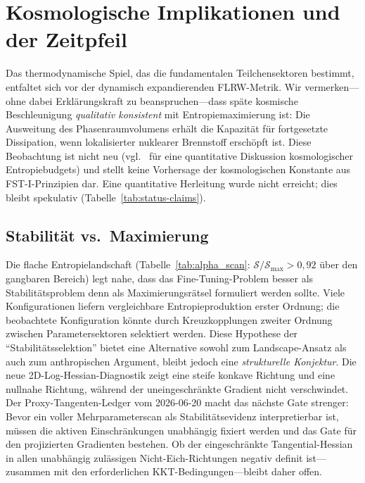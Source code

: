 \documentclass[12pt,a4paper]{article}
\theoremstyle{remark}
\begin{document}
\section{Kosmologische Implikationen und der Zeitpfeil}
\label{sec:cosmology}

Das thermodynamische Spiel, das die fundamentalen Teilchensektoren bestimmt, entfaltet sich vor der dynamisch expandierenden FLRW-Metrik. Wir vermerken---ohne dabei Erkl\"arungskraft zu beanspruchen---dass sp\"ate kosmische Beschleunigung \emph{qualitativ konsistent} mit Entropiemaximierung ist: Die Ausweitung des Phasenraumvolumens erh\"alt die Kapazit\"at f\"ur fortgesetzte Dissipation, wenn lokalisierter nuklearer Brennstoff ersch\"opft ist. Diese Beobachtung ist nicht neu (vgl.\ \citep{EntropyMaximum} f\"ur eine quantitative Diskussion kosmologischer Entropiebudgets) und stellt keine Vorhersage der kosmologischen Konstante aus FST-I-Prinzipien dar. Eine quantitative Herleitung wurde nicht erreicht; dies bleibt spekulativ (Tabelle~\ref{tab:status-claims}).

\subsection{Stabilit\"at vs.\ Maximierung}

Die flache Entropielandschaft (Tabelle~\ref{tab:alpha_scan}: $\mathcal{S}/\mathcal{S}_{\max} > 0{,}92$ \"uber den gangbaren Bereich) legt nahe, dass das Fine-Tuning-Problem besser als Stabilit\"atsproblem denn als Maximierungsr\"atsel formuliert werden sollte. Viele Konfigurationen liefern vergleichbare Entropieproduktion erster Ordnung; die beobachtete Konfiguration k\"onnte durch Kreuzkopplungen zweiter Ordnung zwischen Parametersektoren selektiert werden. Diese Hypothese der ``Stabilit\"atsselektion'' bietet eine Alternative sowohl zum Landscape-Ansatz als auch zum anthropischen Argument, bleibt jedoch eine \emph{strukturelle Konjektur}. Die neue 2D-Log-Hessian-Diagnostik zeigt eine steife konkave Richtung und eine nullnahe Richtung, w\"ahrend der uneingeschr\"ankte Gradient nicht verschwindet. Der Proxy-Tangenten-Ledger vom 2026-06-20 macht das n\"achste Gate strenger: Bevor ein voller Mehrparameterscan als Stabilit\"atsevidenz interpretierbar ist, m\"ussen die aktiven Einschr\"ankungen unabh\"angig fixiert werden und das Gate f\"ur den projizierten Gradienten bestehen. Ob der eingeschr\"ankte Tangential-Hessian in allen unabh\"angig zul\"assigen Nicht-Eich-Richtungen negativ definit ist---zusammen mit den erforderlichen KKT-Bedingungen---bleibt daher offen.
\end{document}
